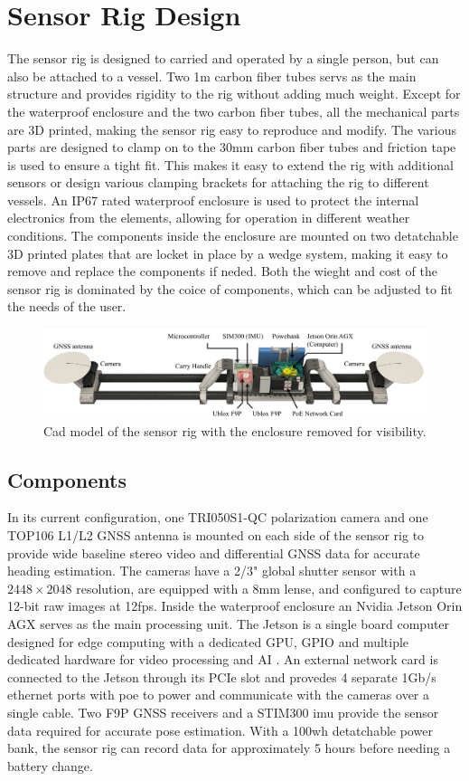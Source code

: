 \section{Sensor Rig Design}
The sensor rig is designed to carried and operated by a single person, but can also be attached to a vessel.
Two 1m carbon fiber tubes servs as the main structure and provides rigidity to the rig without adding much weight.
Except for the waterproof enclosure and the two carbon fiber tubes, all the mechanical parts are 3D printed, making the sensor rig easy to reproduce and modify.
The various parts are designed to clamp on to the 30mm carbon fiber tubes and friction tape is used to ensure a tight fit.
This makes it easy to extend the rig with additional sensors or design various clamping brackets for attaching the rig to different vessels.
An IP67 rated waterproof enclosure is used to protect the internal electronics from the elements, allowing for operation in different weather conditions.
The components inside the enclosure are mounted on two detatchable 3D printed plates that are locket in place by a wedge system, making it easy to remove and replace the components if neded.
Both the wieght and cost of the sensor rig is dominated by the coice of components, which can be adjusted to fit the needs of the user.

\begin{figure}[H]
    \centering
    \includegraphics[width=\textwidth]{figures/rig_components.pdf}
    \caption{Cad model of the sensor rig with the enclosure removed for visibility.}
\end{figure}

\subsection{Components}
In its current configuration, one TRI050S1-QC polarization camera and one TOP106 L1/L2 GNSS antenna is mounted on each side of the sensor rig to provide wide baseline stereo video and differential GNSS data for accurate heading estimation.
The cameras have a 2/3" global shutter sensor with a $2448\times2048$ resolution, are equipped with a 8mm lense, and configured to capture 12-bit raw images at 12fps.
Inside the waterproof enclosure an Nvidia Jetson Orin AGX serves as the main processing unit.
The Jetson is a single board computer designed for edge computing with a dedicated GPU, GPIO and multiple dedicated hardware for video processing and AI \cite{karumbunathanNVIDIAJetsonAGX2022}.
An external network card is connected to the Jetson through its PCIe slot and provedes 4 separate 1Gb/s ethernet ports with \gls{poe} to power and communicate with the cameras over a single cable.
Two F9P GNSS receivers and a STIM300 \gls{imu} provide the sensor data required for accurate pose estimation.
With a 100wh detatchable power bank, the sensor rig can record data for approximately 5 hours before needing a battery change.

